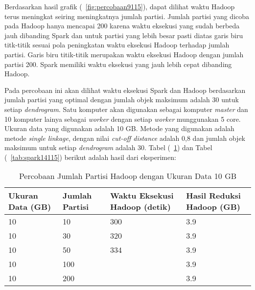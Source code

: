 Berdasarkan hasil grafik (~\ref{fig:percobaan9115}), dapat dilihat waktu Hadoop terus meningkat seiring meningkatnya jumlah partisi. Jumlah partisi yang dicoba pada Hadoop hanya mencapai 200 karena waktu eksekusi yang sudah berbeda jauh dibanding Spark dan untuk partisi yang lebih besar pasti diatas garis biru titk-titik sesuai pola peningkatan waktu eksekusi Hadoop terhadap jumlah partisi. Garis biru titik-titik merupakan waktu eksekusi Hadoop dengan jumlah partisi 200. Spark memiliki waktu eksekusi yang jauh lebih cepat dibanding Hadoop.  



Pada percobaan ini akan dilihat waktu eksekusi Spark dan Hadoop berdasarkan jumlah partisi yang optimal dengan jumlah objek maksimum adalah 30 untuk setiap \textit{dendrogram}. Satu komputer akan digunakan sebagai komputer \textit{master} dan 10 komputer lainya sebagai \textit{worker} dengan setiap \textit{worker} munggunakan 5 core. Ukuran data yang digunakan adalah 10 GB. Metode yang digunakan adalah metode \textit{single linkage}, dengan nilai \textit{cut-off distance} adalah 0,8 dan jumlah objek maksimum untuk setiap \textit{dendrogram} adalah 30. Tabel (~\ref{tab:spark13115}) dan Tabel (~\ref{tab:spark14115}) berikut adalah hasil dari eksperimen:





\begin{table}[H] 
	\centering 
	\caption{Percobaan Jumlah Partisi Hadoop dengan Ukuran Data 10 GB}
	\label{tab:spark13115}
	\begin{tabular}{|p{3cm}|p{3cm}|p{4cm}|p{4cm}|}
\hline
Ukuran Data (GB) & Jumlah Partisi &  Waktu Eksekusi Hadoop (detik) & Hasil Reduksi Hadoop (GB)\\
\hline
10 & 10 & 300  & 3.9  \\
\hline
10 & 30 & 320  & 3.9  \\
\hline
10 & 50 & 334  & 3.9   \\
\hline
10 & 100 &   & 3.9   \\
\hline
10 & 200 &   & 3.9   \\
\hline


\hline

	\end{tabular} 
\end{table}




